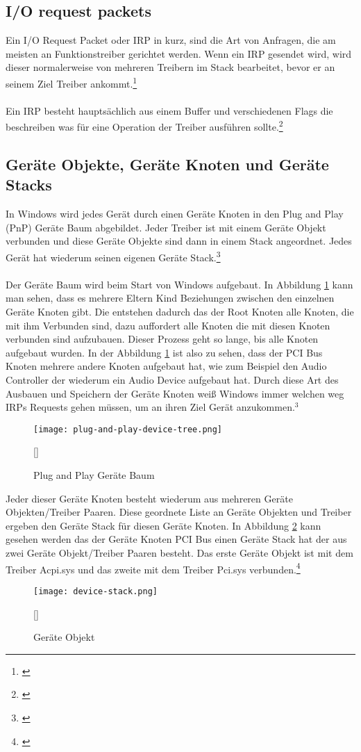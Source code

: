\subsection{I/O request packets}
Ein I/O Request Packet oder IRP in kurz, sind die Art von Anfragen, die am meisten an Funktionstreiber gerichtet werden. Wenn ein IRP gesendet wird, wird dieser normalerweise von mehreren Treibern im Stack bearbeitet, bevor er an seinem Ziel Treiber ankommt.\footnote[2]{\cite[Vgl.][]{23}}
\\\\
Ein IRP besteht hauptsächlich aus einem Buffer und verschiedenen Flags die beschreiben was für eine Operation der Treiber ausführen sollte.\footnote[3]{\cite[Vgl.][]{22}}

\subsection{Geräte Objekte, Geräte Knoten und Geräte Stacks}
In Windows wird jedes Gerät durch einen Geräte Knoten in den Plug and Play (PnP) Geräte Baum abgebildet. Jeder Treiber ist mit einem Geräte Objekt verbunden und diese Geräte Objekte sind dann in einem Stack angeordnet. Jedes Gerät hat wiederum seinen eigenen Geräte Stack.\footnote[4]{\cite[Vgl.][]{24}}
\\\\
Der Geräte Baum wird beim Start von Windows aufgebaut. In Abbildung \ref{windows-plug-and-play-tree} kann man sehen, dass es mehrere Eltern Kind Beziehungen zwischen den einzelnen Geräte Knoten gibt. Die entstehen dadurch das der Root Knoten alle Knoten, die mit ihm Verbunden sind, dazu auffordert alle Knoten die mit diesen Knoten verbunden sind aufzubauen. Dieser Prozess geht so lange, bis alle Knoten aufgebaut wurden. In der Abbildung \ref{windows-plug-and-play-tree} ist also zu sehen, dass der PCI Bus Knoten mehrere andere Knoten aufgebaut hat, wie zum Beispiel den Audio Controller der wiederum ein Audio Device aufgebaut hat. Durch diese Art des Ausbauen und Speichern der Geräte Knoten weiß Windows immer welchen weg IRPs Requests gehen müssen, um an ihren Ziel Gerät anzukommen.$^{3}$
\newpage
\begin{figure}[H]
    \centering
    \texttt{[image: plug-and-play-device-tree.png]}
    \caption[Plug and Play Geräte Baum]{Plug and Play Geräte Baum}[\cite{24}]
    \label{windows-plug-and-play-tree} 
\end{figure}
\noindent
Jeder dieser Geräte Knoten besteht wiederum aus mehreren Geräte Objekten/Treiber Paaren. Diese geordnete Liste an Geräte Objekten und Treiber ergeben den Geräte Stack für diesen Geräte Knoten. In Abbildung \ref{windows-device-object} kann gesehen werden das der Geräte Knoten PCI Bus einen Geräte Stack hat der aus zwei Geräte Objekt/Treiber Paaren besteht. Das erste Geräte Objekt ist mit dem Treiber Acpi.sys und das zweite mit dem Treiber Pci.sys verbunden.\footnote[1]{\cite[Vgl.][]{24}}
\begin{figure}[H]
    \centering
    \texttt{[image: device-stack.png]}
    \caption[Geräte Objekt]{Geräte Objekt}[\cite{24}]
    \label{windows-device-object}
\end{figure}
\noindent

